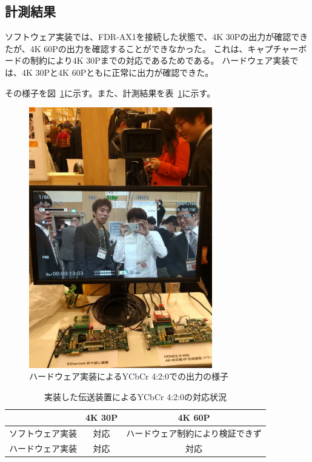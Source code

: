 \subsection{計測結果}
ソフトウェア実装では、FDR-AX1を接続した状態で、4K 30Pの出力が確認できたが、4K 60Pの出力を確認することができなかった。
これは、キャプチャーボードの制約により4K 30Pまでの対応であるためである。
ハードウェア実装では、4K 30Pと4K 60Pともに正常に出力が確認できた。

その様子を図~\ref{fig:orf2016}に示す。また、計測結果を表~\ref{tb:ycbcr-compatible}に示す。

\begin{figure}[htbp]
  \begin{center}
    \includegraphics[bb=0 0 1200 1703,width=8cm]{img/orf2016.png}
  \end{center}
  \caption{ハードウェア実装によるYCbCr 4:2:0での出力の様子}
  \label{fig:orf2016}
\end{figure}

\begin{table}[htbp]
  \caption{実装した伝送装置によるYCbCr 4:2:0の対応状況}
  \label{tb:ycbcr-compatible}
  \begin{center}
  \begin{tabular}{c|c|c}
    \hline
                   & 4K 30P & 4K 60P \\\hline\hline
     ソフトウェア実装 & 対応   & ハードウェア制約により検証できず  \\\hline
     ハードウェア実装 & 対応   & 対応  \\\hline
  \end{tabular}\end{center}
\end{table}

